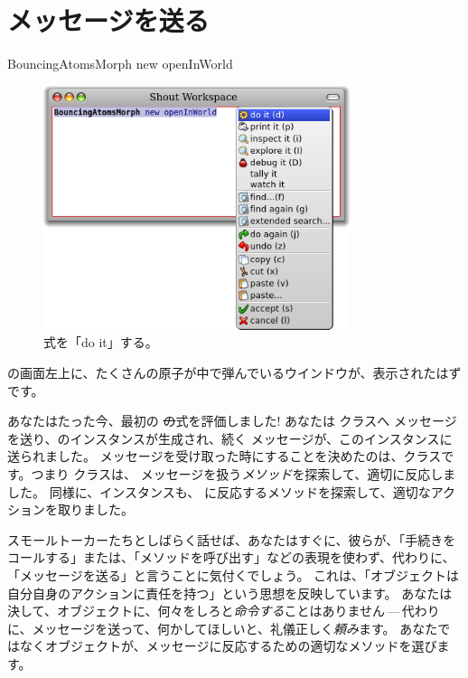 \documentclass[a4paper,10pt,twoside]{book}
\begin{document}
\section{メッセージを送る}


\begin{code}{}
BouncingAtomsMorph new openInWorld
\end{code}


\begin{figure}[htb]
\centerline {\includegraphics[width=0.8\textwidth]{Doit}}
\caption{式を「do it」する。}
\end{figure}

\pharo の画面左上に、たくさんの原子が中で弾んでいるウインドウが、表示されたはずです。

あなたはたった今、最初の \st の式を評価しました!
あなたは \bam クラスへ  メッセージを送り、\bam のインスタンスが生成され、続く  メッセージが、このインスタンスに送られました。
 メッセージを受け取った時にすることを決めたのは、\bam クラスです。つまり \bam クラスは、 メッセージを扱う\emph{メソッド}を探索して、適切に反応しました。
同様に、\bam インスタンスも、 に反応するメソッドを探索して、適切なアクションを取りました。

スモールトーカーたちとしばらく話せば、あなたはすぐに、彼らが、「手続きをコールする」または、「メソッドを呼び出す」などの表現を使わず、代わりに、「メッセージを送る」と言うことに気付くでしょう。
これは、「オブジェクトは自分自身のアクションに責任を持つ」という思想を反映しています。
あなたは決して、オブジェクトに、何々をしろと\emph{命令する}ことはありません\,---\,代わりに、メッセージを送って、何かしてほしいと、礼儀正しく\emph{頼み}ます。
あなたではなくオブジェクトが、メッセージに反応するための適切なメソッドを選びます。
\end{document}
